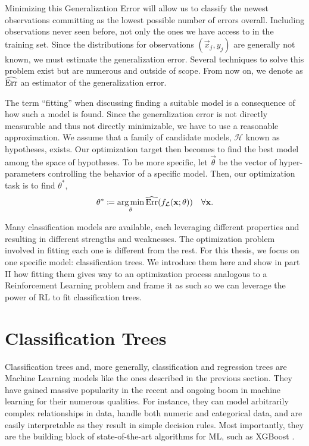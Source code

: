 Minimizing this Generalization Error will allow us to classify the newest
observations committing as the lowest possible number of errors overall.
Including observations never seen before, not only the ones we have access to in
the training set. Since the distributions for observations $(\vec{x}_j, y_j)$
are generally not known, we must estimate the generalization error. Several
techniques to solve this problem exist but are numerous and outside of scope.
From now on, we denote as $\widehat{\operatorname*{Err}}$ an estimator of the generalization
error.

The term ``fitting'' when discussing finding a suitable model is a consequence
of how such a model is found. Since the generalization error is not directly
measurable and thus not directly minimizable, we have to use a reasonable
approximation. We assume that a family of candidate models, $\mathcal{H}$ known
as hypotheses, exists. Our optimization target then becomes to find the best
model among the space of hypotheses. To be more specific, let $\vec{\theta}$ be
the vector of hyper-parameters controlling the behavior of a specific model.
Then, our optimization task is to find $\theta^{*}$,
\begin{equation*}
    \theta^{*} \coloneqq \operatorname*{arg\,min}_{\theta} \widehat{\operatorname*{Err}}(f_{\mathcal{L}} (\mathbf{x}; \theta)) \quad \forall \mathbf{x}.
\end{equation*}

Many classification models are available, each leveraging different
properties and resulting in different strengths and weaknesses. The optimization
problem involved in fitting each one is different from the rest. For this thesis, we focus on one specific model: classification trees. We
introduce them here and show in part II how fitting them gives way to an
optimization process analogous to a Reinforcement Learning problem and frame it
as such so we can leverage the power of RL to fit classification trees.

\section{Classification Trees}
Classification trees and, more generally, classification and regression trees
are Machine Learning models like the ones described in the previous section.
They have gained massive popularity in the recent and ongoing boom in machine
learning for their numerous qualities. For instance, they can model arbitrarily
complex relationships in data, handle both numeric and categorical data, and are
easily interpretable as they result in simple decision rules. Most importantly,
they are the building block of state-of-the-art algorithms for ML, such as
XGBoost \cite{XGBoost}.

